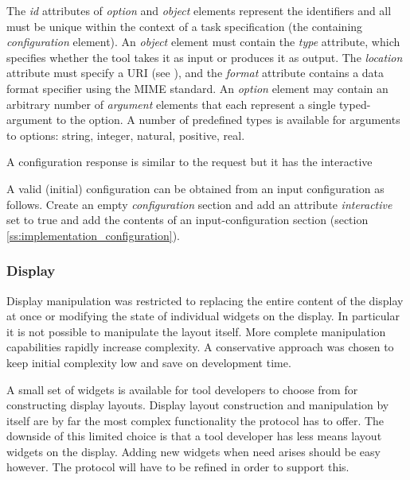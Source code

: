 \documentclass{article}
\begin{document}
   The \textit{id} attributes of \textit{option} and \textit{object} elements
   represent the identifiers and all must be unique within the context of a
   task specification (the containing \textit{configuration} element).  An
   \textit{object} element must contain the \textit{type} attribute, which
   specifies whether the tool takes it as input or produces it as output. The
   \textit{location} attribute must specify a URI (see \cite{rfc3305}), and the
   \textit{format} attribute contains a data format specifier using the MIME
   standard.  An \textit{option} element may contain an arbitrary number of
   \textit{argument} elements that each represent a single typed-argument to
   the option. A number of predefined types is available for arguments to
   options: string, integer, natural, positive, real.

   A configuration response is similar to the request but it has the interactive 

   A valid (initial) configuration can be obtained from an input configuration
   as follows.  Create an empty \textit{configuration} section and add an
   attribute \textit{interactive} set to true and add the contents of an
   input-configuration section (section \ref{ss:implementation_configuration}).

  \subsubsection{Display}

   Display manipulation was restricted to replacing the entire content of the
   display at once or modifying the state of individual widgets on the display.
   In particular it is not possible to manipulate the layout itself. More
   complete manipulation capabilities rapidly increase complexity. A
   conservative approach was chosen to keep initial complexity low and save on
   development time.


   A small set of widgets is available for tool developers to choose from for
   constructing display layouts. Display layout construction and manipulation
   by itself are by far the most complex functionality the protocol has to
   offer.  The downside of this limited choice is that a tool developer has
   less means layout widgets on the display. Adding new widgets when need
   arises should be easy however. The protocol will have to be refined in order
   to support this.
   
\end{document}
